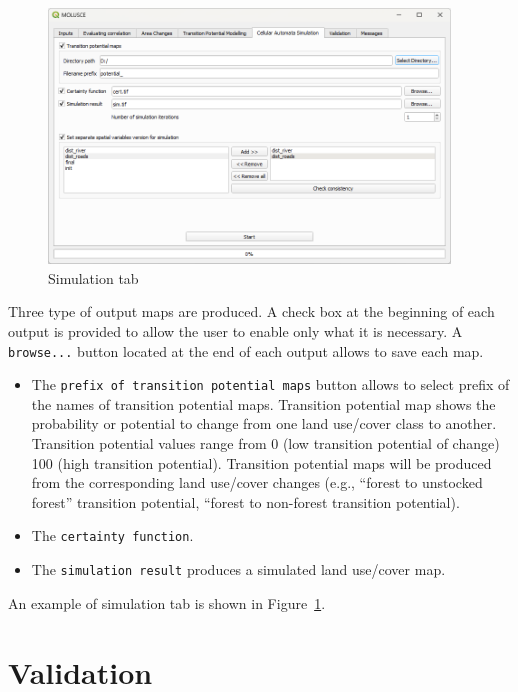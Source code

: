 \documentclass{report}
\begin{document}
\begin{figure}[h!]
\centering
\includegraphics[width=0.95\textwidth]{img/simulation_tab.png}
\caption{Simulation tab}
\label{fig:simulation_tab}
\end{figure}

Three type of output maps are produced. A check box at the beginning of each output is provided to
allow the user to enable only what it is necessary. A \verb+browse...+ button located at the end of each
output allows to save each map.

\begin{itemize}
  \item The \verb+prefix of transition potential maps+ button allows to select prefix of the names of
    transition potential maps. Transition potential map shows the probability or potential to
    change from one land use/cover class to another. Transition potential values range from 0
    (low transition potential of change) 100 (high transition potential). Transition potential maps
    will be produced from the corresponding land use/cover changes (e.g., “forest to unstocked
    forest” transition potential, “forest to non-forest transition potential).
  \item The \verb+certainty function+.
  \item The \verb+simulation result+ produces a simulated land use/cover map.
\end{itemize}

An example of simulation tab is shown in Figure~\ref{fig:simulation_tab}.

\section{Validation}
\end{document}
